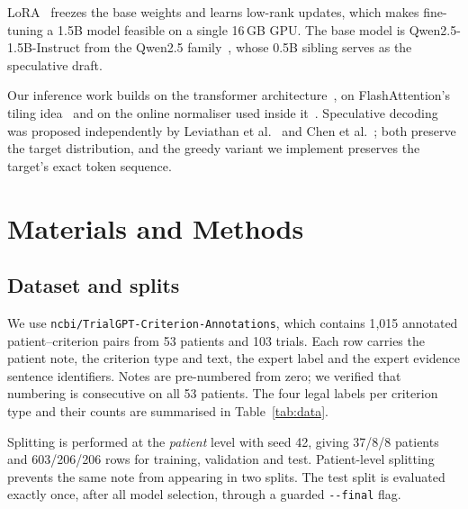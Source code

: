 \documentclass[conference]{IEEEtran}
\begin{document}
LoRA~\cite{hu2022lora} freezes the base weights and learns low-rank updates, which makes fine-tuning
a 1.5B model feasible on a single 16\,GB GPU. The base model is Qwen2.5-1.5B-Instruct from the
Qwen2.5 family~\cite{yang2024qwen25}, whose 0.5B sibling serves as the speculative draft.

Our inference work builds on the transformer architecture~\cite{vaswani2017attention}, on
FlashAttention's tiling idea~\cite{dao2022flashattention} and on the online normaliser used inside
it~\cite{milakov2018online}. Speculative decoding was proposed independently by
Leviathan et al.~\cite{leviathan2023speculative} and Chen et al.~\cite{chen2023speculative}; both
preserve the target distribution, and the greedy variant we implement preserves the target's exact
token sequence.

\section{Materials and Methods}

\subsection{Dataset and splits}
We use \texttt{ncbi/TrialGPT-Criterion-Annotations}, which contains 1{,}015 annotated
patient--criterion pairs from 53 patients and 103 trials. Each row carries the patient note, the
criterion type and text, the expert label and the expert evidence sentence identifiers. Notes are
pre-numbered from zero; we verified that numbering is consecutive on all 53 patients. The four
legal labels per criterion type and their counts are summarised in Table~\ref{tab:data}.

Splitting is performed at the \emph{patient} level with seed 42, giving 37/8/8 patients and
603/206/206 rows for training, validation and test. Patient-level splitting prevents the same note
from appearing in two splits. The test split is evaluated exactly once, after all model selection,
through a guarded \texttt{-{}-final} flag.
\end{document}

